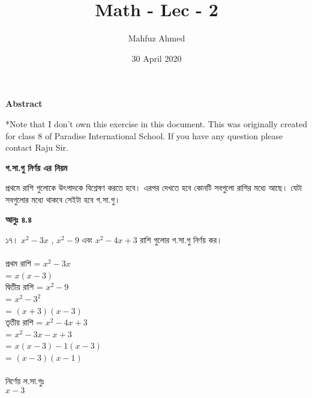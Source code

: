 \documentclass{article}
\title{Math - Lec - 2}
\author{Mahfuz Ahmed }
\date{30 April 2020}
\begin{document}
    \maketitle
    \begin{center}
    	\textbf{Abstract}
    \end{center}
    \begin{center}
*Note that I don't own this exercise in this document. This was originally created
for class 8 of Paradise International School. If you have any question please contact Raju Sir. \\
    \end{center}        
    
\large 
    \begin{center}
    	\textbf{গ.সা.গু নির্ণয় এর নিয়ম}
    \end{center}

 প্রথমে রাশি গুলোকে উৎপাদকে বিশ্লেষণ করতে হবে। এরপর দেখতে হবে কোনটি সবগুলো রাশির মধ্যে আছে। 
 যেটা সবগুলোর মধ্যে থাকবে সেইটা হবে গ.সা.গু।
\vspace{3mm}
\large
\begin{center}
	\textbf{আনুঃ ৪.৪}
\end{center}

১৭। $x^2-3x$ , $x^2-9$ এবং $x^2-4x+3$ রাশি গুলোর গ.সা.গু নির্ণয় কর।\\ \\   
\hspace*{12mm}প্রথম রাশি\hspace{1mm} = $x^2-3x$\\
\hspace*{2.8cm} = $x(x-3)$\\

\hspace*{7mm}দ্বিতীয় রাশি = $x^2-9$\\
\hspace*{2.8cm} = $x^2-3^2$\\
\hspace*{2.8cm} = $(x+3)(x-3)$\\ 

\hspace*{7mm}তৃতীয় রাশি = $x^2-4x+3$\\
\hspace*{2.8cm} = $x^2-3x-x+3$\\
\hspace*{2.8cm} = $x(x-3)-1(x-3)$\\
\hspace*{2.8cm} = $(x-3)(x-1)$\\ \\

\hspace*{7mm}নির্ণেয় ল.সা.গুঃ\\ 
\hspace*{2.8cm}$x-3$\\
\end{document}
